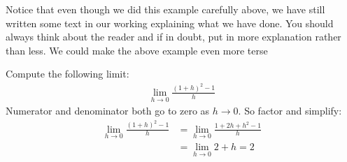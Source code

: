 Notice that even though we did this example carefully above, we have still
written some text in our working explaining what we have done. You should
always think about the reader and if in doubt, put in more explanation rather
than less. We could make the above example even more terse
\begin{eg}
 Compute the following limit:
 \begin{align*}
  \lim_{h \to 0} \frac{(1+h)^2-1}{h}
 \end{align*}
 Numerator and denominator both go to zero as $h\to 0$. So factor and simplify:
 \begin{align*}
  \lim_{h \to 0} \frac{(1+h)^2-1}{h}
  &= \lim_{h \to 0} \frac{1+2h+h^2-1}{h} \\
  &= \lim_{h \to 0} 2+h = 2
 \end{align*}
\end{eg}


